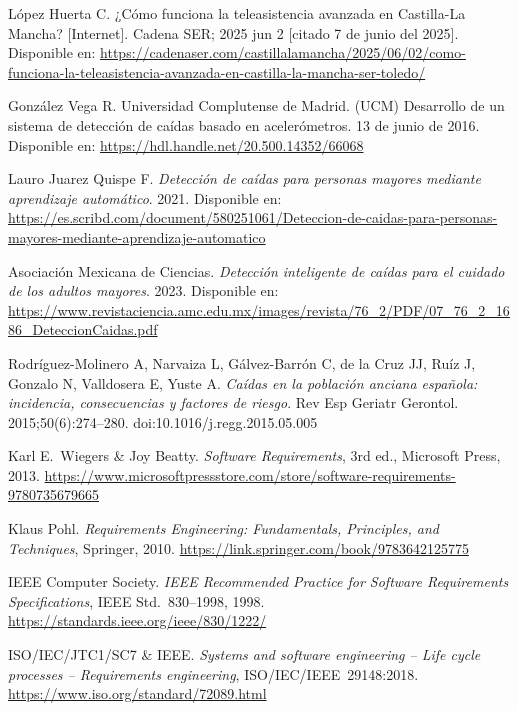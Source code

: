 \documentclass[12pt, a4paper]{article}
\begin{document}
\begin{thebibliography}{9}
		
	López Huerta C. ¿Cómo funciona la teleasistencia avanzada en Castilla-La Mancha? [Internet]. Cadena SER; 2025 jun 2 [citado 7 de junio del 2025]. Disponible en: \url{https://cadenaser.com/castillalamancha/2025/06/02/como-funciona-la-teleasistencia-avanzada-en-castilla-la-mancha-ser-toledo/}
	
	
	González Vega R. Universidad Complutense de Madrid. (UCM) 
	Desarrollo de un sistema de detección de caídas basado en acelerómetros. 13 de junio de 2016.
	Disponible en: \url{https://hdl.handle.net/20.500.14352/66068}
	
	Lauro Juarez Quispe F.
	\textit{Detección de caídas para personas mayores mediante aprendizaje automático}.
	2021.
	Disponible en: \url{https://es.scribd.com/document/580251061/Deteccion-de-caidas-para-personas-mayores-mediante-aprendizaje-automatico}
	
	Asociación Mexicana de Ciencias.
	\textit{Detección inteligente de caídas para el cuidado de los adultos mayores}.
	2023.
	Disponible en: \url{https://www.revistaciencia.amc.edu.mx/images/revista/76_2/PDF/07_76_2_1686_DeteccionCaidas.pdf}
	
	Rodríguez-Molinero A, Narvaiza L, Gálvez-Barrón C, de la Cruz JJ, Ruíz J, Gonzalo N, Valldosera E, Yuste A.
	\textit{Caídas en la población anciana española: incidencia, consecuencias y factores de riesgo}.
	Rev Esp Geriatr Gerontol. 2015;50(6):274–280.
	doi:10.1016/j.regg.2015.05.005
	
	


	Karl E.\ Wiegers \& Joy Beatty.
	\textit{Software Requirements}, 3rd ed.,
	Microsoft Press, 2013.
	\url{https://www.microsoftpressstore.com/store/software-requirements-9780735679665}
	
	Klaus Pohl.
	\textit{Requirements Engineering: Fundamentals, Principles, and Techniques},
	Springer, 2010.
	\url{https://link.springer.com/book/9783642125775}
		
	IEEE Computer Society.
	\textit{IEEE Recommended Practice for Software Requirements Specifications},
	IEEE Std.\ 830--1998, 1998.
	\url{https://standards.ieee.org/ieee/830/1222/}
	
	ISO/IEC/JTC1/SC7 \& IEEE.
	\textit{Systems and software engineering -- Life cycle processes -- Requirements engineering},
	ISO/IEC/IEEE 29148:2018.
	\url{https://www.iso.org/standard/72089.html}
	

\end{thebibliography}
\end{document}
